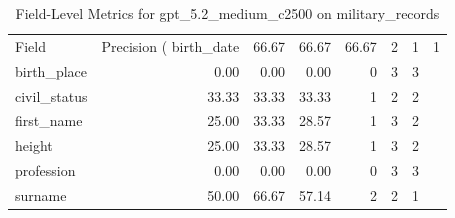 \begin{table}
\caption{Field-Level Metrics for gpt_5.2_medium_c2500 on military_records}
\label{tab:fields_gpt_5.2_medium_c2500_military_records}
\begin{tabular}{lrrrrrr}
\toprule
Field & Precision (%
\midrule
birth_date & 66.67 & 66.67 & 66.67 & 2 & 1 & 1 \\
birth_place & 0.00 & 0.00 & 0.00 & 0 & 3 & 3 \\
civil_status & 33.33 & 33.33 & 33.33 & 1 & 2 & 2 \\
first_name & 25.00 & 33.33 & 28.57 & 1 & 3 & 2 \\
height & 25.00 & 33.33 & 28.57 & 1 & 3 & 2 \\
profession & 0.00 & 0.00 & 0.00 & 0 & 3 & 3 \\
surname & 50.00 & 66.67 & 57.14 & 2 & 2 & 1 \\
\bottomrule
\end{tabular}
\end{table}
